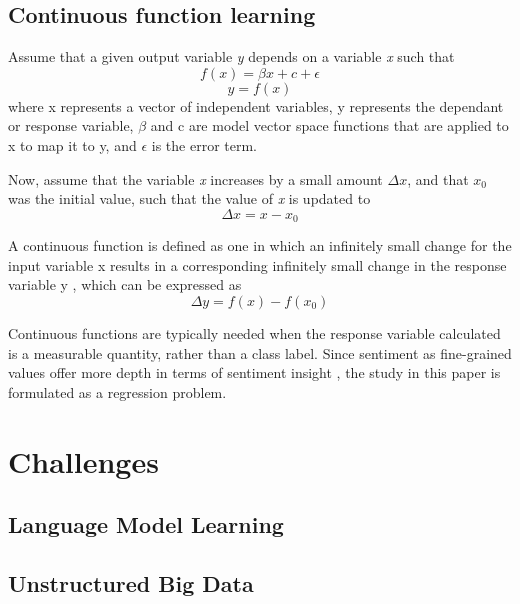 \documentclass[conference]{IEEEtran}
\begin{document}
\subsection{Continuous function learning}
Assume that a given output variable \textit{y} depends on a variable \textit{x} such that
\begin{equation}
\displaystyle f(x) = \beta x + c + \epsilon
\end{equation}
\begin{equation}
\displaystyle y = f(x)
\end{equation}
where x represents a vector of independent variables, y represents the dependant or response variable, $\beta$ and c are model vector space functions that are applied to x to map it to y, and $\epsilon$ is the error term.

Now, assume that the variable \textit{x} increases by a small amount $\Delta x$, and that $x_0$ was the initial value, such that the value of \textit{x} is updated to
\begin{equation}
\displaystyle \Delta x = x - x_0
\end{equation}

A continuous function is defined as one in which an infinitely small change for the input variable x results in a corresponding infinitely small change in the response variable y \cite{continuous_function}, which can be expressed as
\begin{equation}
\displaystyle \Delta y = f(x) - f(x_0)
\end{equation}

Continuous functions are typically needed when the response variable calculated is a measurable quantity, rather than a class label. Since sentiment as fine-grained values offer more depth in terms of sentiment insight \cite{drake2008sentiment}, the study in this paper is formulated as a regression problem.

\section{Challenges}

\subsection{Language Model Learning}

\subsection{Unstructured Big Data}
\end{document}
